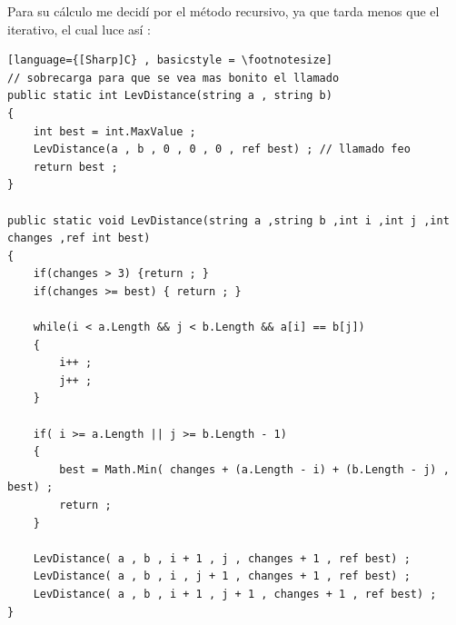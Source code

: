 \documentclass{article}
\begin{document}
Para su cálculo me decidí por el método recursivo, ya que tarda menos que el iterativo, el cual luce así :
\newpage
\begin{lstlisting}[language={[Sharp]C} , basicstyle = \footnotesize]
// sobrecarga para que se vea mas bonito el llamado
public static int LevDistance(string a , string b) 
{
    int best = int.MaxValue ;
    LevDistance(a , b , 0 , 0 , 0 , ref best) ; // llamado feo
    return best ;
}

public static void LevDistance(string a ,string b ,int i ,int j ,int changes ,ref int best)
{
    if(changes > 3) {return ; }
    if(changes >= best) { return ; }

    while(i < a.Length && j < b.Length && a[i] == b[j])
    {
        i++ ;
        j++ ;
    }
        
    if( i >= a.Length || j >= b.Length - 1)
    {
        best = Math.Min( changes + (a.Length - i) + (b.Length - j) , best) ;
        return ;
    }
    
    LevDistance( a , b , i + 1 , j , changes + 1 , ref best) ;
    LevDistance( a , b , i , j + 1 , changes + 1 , ref best) ;
    LevDistance( a , b , i + 1 , j + 1 , changes + 1 , ref best) ;
}           
\end{lstlisting}
\end{document}
